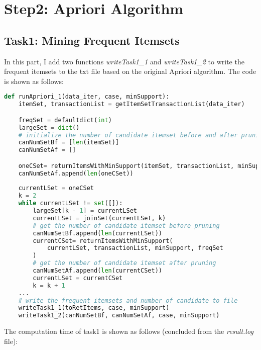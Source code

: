 \documentclass[a4paper, oneside, final, 12pt]{scrartcl} %
\begin{document}
\section{Step2: Apriori Algorithm}

\subsection{Task1: Mining Frequent Itemsets}

In this part, I add two functions \emph{writeTask1\_1} and \emph{writeTask1\_2} to
write the frequent itemsets to the txt file based on the original Apriori algorithm. 
The code is shown as follows:

\begin{lstlisting}[language=Python]
  def runApriori_1(data_iter, case, minSupport):
    itemSet, transactionList = getItemSetTransactionList(data_iter)

    freqSet = defaultdict(int)
    largeSet = dict()
    # initialize the number of candidate itemset before and after pruning
    canNumSetBf = [len(itemSet)]
    canNumSetAf = []

    oneCSet= returnItemsWithMinSupport(itemSet, transactionList, minSupport, freqSet)
    canNumSetAf.append(len(oneCSet))
    
    currentLSet = oneCSet
    k = 2
    while currentLSet != set([]):    
        largeSet[k - 1] = currentLSet
        currentLSet = joinSet(currentLSet, k)
        # get the number of candidate itemset before pruning
        canNumSetBf.append(len(currentLSet))
        currentCSet= returnItemsWithMinSupport(
            currentLSet, transactionList, minSupport, freqSet
        )
        # get the number of candidate itemset after pruning
        canNumSetAf.append(len(currentCSet))
        currentLSet = currentCSet
        k = k + 1
    ...
    # write the frequent itemsets and number of candidate to file
    writeTask1_1(toRetItems, case, minSupport)
    writeTask1_2(canNumSetBf, canNumSetAf, case, minSupport)
\end{lstlisting}

The computation time of task1 is shown as follows 
(concluded from the \emph{result.log} file):
\end{document}

